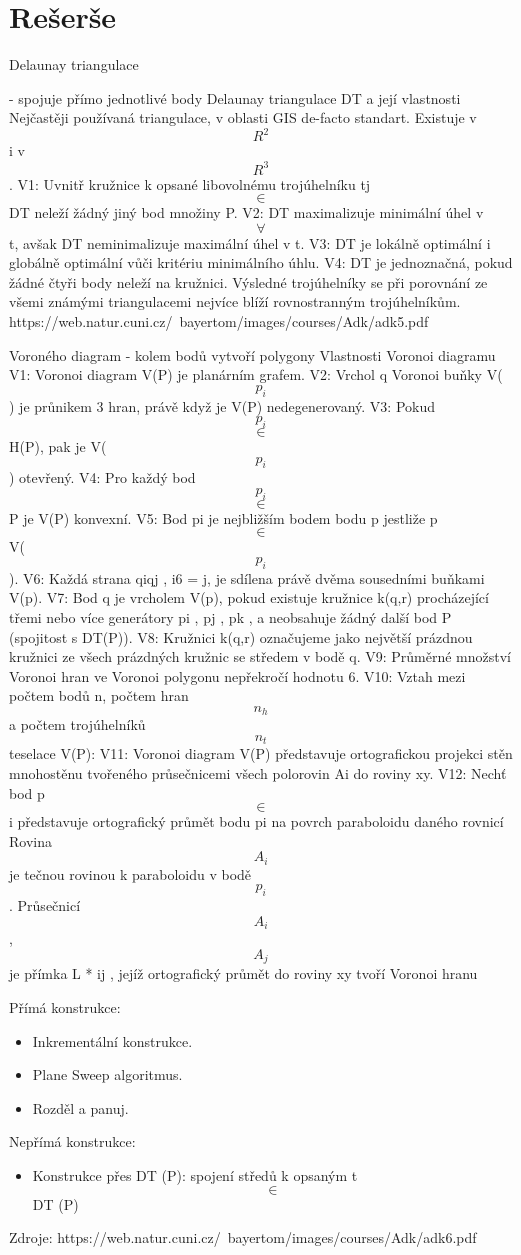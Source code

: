 \chapter{Rešerše}
\label{0-reserse}

Delaunay triangulace
 
-	spojuje přímo jednotlivé body
Delaunay triangulace DT a její vlastnosti 
Nejčastěji používaná triangulace, v oblasti GIS de-facto standart. Existuje v \[R^2\] i v \[R^3\]. 
V1: Uvnitř kružnice k opsané libovolnému trojúhelníku tj \[\in\] DT neleží žádný jiný bod množiny P. 
V2: DT maximalizuje minimální úhel v \[\forall\] t, avšak DT neminimalizuje maximální úhel v t.
V3: DT je lokálně optimální i globálně optimální vůči kritériu minimálního úhlu.
V4: DT je jednoznačná, pokud žádné čtyři body neleží na kružnici.
Výsledné trojúhelníky se při porovnání ze všemi známými triangulacemi nejvíce blíží rovnostranným trojúhelníkům.
https://web.natur.cuni.cz/~bayertom/images/courses/Adk/adk5.pdf

Voroného diagram
-	kolem bodů vytvoří polygony
Vlastnosti Voronoi diagramu 
V1: Voronoi diagram V(P) je planárním grafem. 
V2: Vrchol q Voronoi buňky V(\[p_i\]) je průnikem 3 hran, právě když je V(P) nedegenerovaný.
 V3: Pokud \[p_i\] \[\in\] H(P), pak je V(\[p_i\]) otevřený. 
V4: Pro každý bod \[p_i\] \[\in\] P je V(P) konvexní. 
V5: Bod pi je nejbližším bodem bodu p jestliže p \[\in\] V(\[p_i\]). 
V6: Každá strana qiqj , i6 = j, je sdílena právě dvěma sousedními buňkami V(p). 
V7: Bod q je vrcholem V(p), pokud existuje kružnice k(q,r) procházející třemi nebo více generátory pi , pj , pk , a neobsahuje žádný další bod P (spojitost s DT(P)). 
V8: Kružnici k(q,r) označujeme jako největší prázdnou kružnici ze všech prázdných kružnic se středem v bodě q. 
V9: Průměrné množství Voronoi hran ve Voronoi polygonu nepřekročí hodnotu 6. 
V10: Vztah mezi počtem bodů n, počtem hran \[n_h\] a počtem trojúhelníků \[n_t\] teselace V(P):
V11: Voronoi diagram V(P) představuje ortografickou projekci stěn mnohostěnu tvořeného průsečnicemi všech polorovin Ai do roviny xy. 
V12: Nechť bod p \[\in\] i představuje ortografický průmět bodu pi na povrch paraboloidu daného rovnicí
Rovina \[A_i\] je tečnou rovinou k paraboloidu v bodě \[p_i\]. Průsečnicí \[A_i\] , \[A_j\] je přímka L * ij , jejíž ortografický průmět do roviny xy tvoří Voronoi hranu

Přímá konstrukce:
\begin{itemize}
\item	Inkrementální konstrukce. 
\item	Plane Sweep algoritmus. 
\item	Rozděl a panuj. 
\end{itemize}
Nepřímá konstrukce: 
\begin{itemize}
\item	Konstrukce přes DT (P): spojení středů k opsaným t \[\in\] DT (P)
\end{itemize}
Zdroje: https://web.natur.cuni.cz/~bayertom/images/courses/Adk/adk6.pdf
